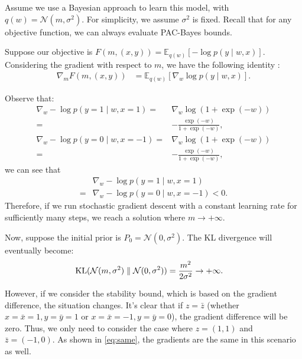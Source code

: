 Assume we use a Bayesian approach to learn this model, with \( q(w) = \mathcal{N}(m, \sigma^2) \). For simplicity, we assume \(\sigma^2\) is fixed. Recall that for any objective function, we can always evaluate PAC-Bayes bounds.

Suppose our objective is \( F(m, (x, y)) = \mathbb{E}_{q(w)}[-\log p(y \mid w, x)] \). Considering the gradient with respect to \(m\), we have the following identity 
\citep{rezende2014stochastic, opper2008variational}:
\begin{align}
    \nabla_m F(m, (x, y)) &= \mathbb{E}_{q(w)} [\nabla_w \log p(y \mid w, x)].
\end{align}

Observe that:
\begin{align*}
    \nabla_w -\log p(y=1 \mid w, x=1)
    =& \nabla_w \log (1+\exp(-w)) \\
    =& -\frac{\exp{(-w)}}{1+\exp(-w)}, \\
    \nabla_w -\log p(y=0 \mid w, x=-1) 
    =& \nabla_w \log (1+\exp(-w)) \\
    =& -\frac{\exp(-w)}{1+\exp(-w)}, 
\end{align*}
we can see that
\begin{align}
    &\nabla_w -\log p(y=1 \mid w, x=1) \nonumber \\
    = &\nabla_w -\log p(y=0 \mid w, x=-1) < 0. 
    \label{eq:same}
\end{align}
Therefore,
if we run stochastic gradient descent with a constant learning rate for sufficiently many steps, we reach a solution where \(m \rightarrow +\infty\).

Now, suppose the initial prior is \( P_0 = \mathcal{N}(0, \sigma^2) \). The KL divergence will eventually become:
\begin{align}
    \text{KL}(\mathcal{N}(m, \sigma^2) \parallel \mathcal{N}(0, \sigma^2)) &= \frac{m^2}{2\sigma^2} \rightarrow +\infty.
\end{align}

However, if we consider the stability bound, which is based on the gradient difference, the situation changes. It’s clear that if \( z = \bar{z} \) (whether \( x = \bar{x} = 1, y = \bar{y} = 1 \) or \( x = \bar{x} = -1, y = \bar{y} = 0 \)), the gradient difference will be zero. Thus, we only need to consider the case where \( z = (1, 1) \) and \( \bar{z} = (-1, 0) \). As shown in \cref{eq:same}, the gradients are the same in this scenario as well.

